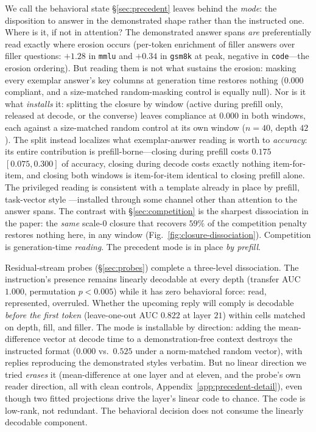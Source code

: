 \documentclass{article}
\begin{document}
We call the behavioral state \S\ref{sec:precedent} leaves behind the \emph{mode}: the
disposition to answer in the demonstrated shape rather than the instructed one. Where is it, if not
in attention? The demonstrated answer spans \emph{are}
preferentially read exactly where erosion occurs (per-token enrichment of filler answers over
filler questions: $+1.28$ in \texttt{mmlu} and $+0.34$ in \texttt{gsm8k} at peak, negative in
\texttt{code}---the erosion ordering). But reading them is not what sustains the erosion:
masking every exemplar answer's key columns at generation time restores nothing ($0.000$
compliant, and a size-matched random-masking control is equally null). Nor is it what
\emph{installs} it: splitting the closure by window (active during prefill only, released at
decode, or the converse) leaves compliance at $0.000$ in both windows, each against a
size-matched random control at its own window ($n{=}40$, depth $42$). The split instead
localizes what exemplar-answer reading is worth to \emph{accuracy}: its entire contribution is
prefill-borne---closing during prefill costs $0.175$ $[0.075,0.300]$ of accuracy, closing
during decode costs exactly nothing item-for-item, and closing both windows is item-for-item
identical to closing prefill alone. The privileged reading is consistent with a template already in place by
prefill, task-vector style \citep{hendel2023taskvectors}---installed through some channel
other than attention to the answer spans. The contrast with \S\ref{sec:competition} is the
sharpest dissociation in the paper: the \emph{same} scale-$0$ closure that recovers $59\%$ of
the competition penalty restores nothing here, in any window
(Fig.~\ref{fig:closure-dissociation}). Competition is generation-time \emph{reading}. The
precedent mode is in place \emph{by prefill}.

Residual-stream probes (\S\ref{sec:probes}) complete a three-level dissociation. The
instruction's presence remains linearly decodable at every depth (transfer AUC
$1.000$, permutation $p{<}0.005$) while it has zero behavioral force: read, represented,
overruled. Whether the upcoming reply will comply is decodable \emph{before the first token}
(leave-one-out AUC $0.822$ at layer $21$) within cells matched on depth, fill, and filler. The
mode is installable by direction: adding the mean-difference vector at decode time to a
demonstration-free context destroys the instructed format ($0.000$ vs.\ $0.525$ under a
norm-matched random vector), with replies reproducing the demonstrated styles verbatim. But no
linear direction we tried \emph{erases} it (mean-difference at one layer and at eleven, and the
probe's own reader direction, all with clean controls,
Appendix~\ref{app:precedent-detail}), even though two fitted projections drive the layer's
linear code to chance. The code is low-rank, not redundant. The behavioral decision does not
consume the linearly decodable component.
\end{document}
